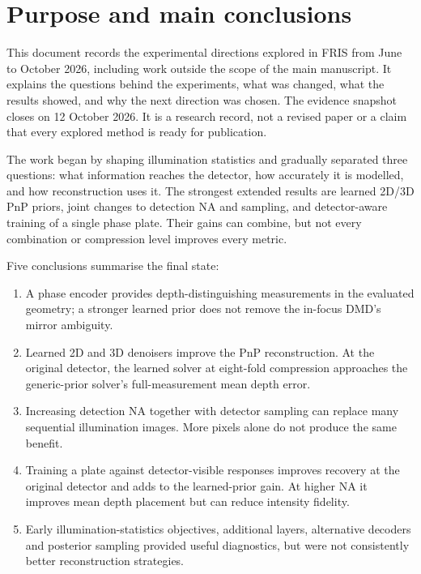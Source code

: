 \section{Purpose and main conclusions}

This document records the experimental directions explored in FRIS from June to October 2026, including work outside the scope of the main manuscript. It explains the questions behind the experiments, what was changed, what the results showed, and why the next direction was chosen. The evidence snapshot closes on 12 October 2026. It is a research record, not a revised paper or a claim that every explored method is ready for publication.

The work began by shaping illumination statistics and gradually separated three questions: what information reaches the detector, how accurately it is modelled, and how reconstruction uses it. The strongest extended results are learned 2D/3D PnP priors, joint changes to detection NA and sampling, and detector-aware training of a single phase plate. Their gains can combine, but not every combination or compression level improves every metric.

Five conclusions summarise the final state:

\begin{enumerate}
\item A phase encoder provides depth-distinguishing measurements in the evaluated geometry; a stronger learned prior does not remove the in-focus DMD's mirror ambiguity.
\item Learned 2D and 3D denoisers improve the PnP reconstruction. At the original detector, the learned solver at eight-fold compression approaches the generic-prior solver's full-measurement mean depth error.
\item Increasing detection NA together with detector sampling can replace many sequential illumination images. More pixels alone do not produce the same benefit.
\item Training a plate against detector-visible responses improves recovery at the original detector and adds to the learned-prior gain. At higher NA it improves mean depth placement but can reduce intensity fidelity.
\item Early illumination-statistics objectives, additional layers, alternative decoders and posterior sampling provided useful diagnostics, but were not consistently better reconstruction strategies.
\end{enumerate}

